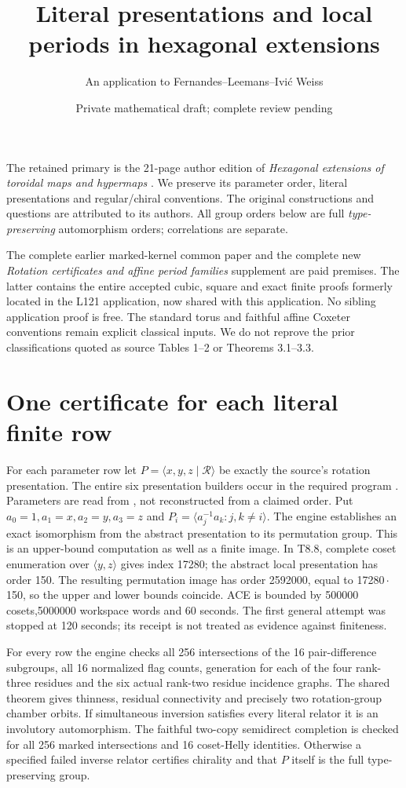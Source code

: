 \documentclass[10pt,a4paper]{article}
\title{Literal presentations and local periods in hexagonal extensions}
\author{An application to Fernandes--Leemans--Ivi\'c Weiss}
\date{Private mathematical draft; complete review pending}
\newcommand{\gen}[1]{\langle#1\rangle}
\begin{document}
\maketitle
The retained primary is the 21-page author edition of
\emph{Hexagonal extensions of toroidal maps and hypermaps} \cite{source}.
We preserve its parameter order, literal presentations and regular/chiral
conventions. The original constructions and questions are attributed to
its authors. All group orders below are full \emph{type-preserving}
automorphism orders; correlations are separate.

The complete earlier marked-kernel common paper and the complete new
\emph{Rotation certificates and affine period families} supplement are
paid premises. The latter contains the entire accepted cubic, square
and exact finite proofs formerly located in the L121 application, now
shared with this application. No sibling application proof is free.
The standard torus and faithful affine Coxeter conventions remain
explicit classical inputs. We do not reprove the prior classifications
quoted as source Tables 1--2 or Theorems 3.1--3.3.

\section{One certificate for each literal finite row}
For each parameter row let $P=\gen{x,y,z\mid\mathcal R}$ be exactly the
source's rotation presentation. The entire six presentation builders
occur in the required program .
Parameters are read from , not reconstructed
from a claimed order. Put $a_0=1,a_1=x,a_2=y,a_3=z$ and
$P_i=\gen{a_j^{-1}a_k:j,k\ne i}$.
The engine establishes an exact isomorphism from the abstract
presentation to its permutation group. This is an upper-bound
computation as well as a finite image. In T8.8, complete coset
enumeration over $\gen{y,z}$ gives index 17280; the abstract local
presentation has order 150. The resulting permutation image has
order 2592000, equal to 17280\,$\cdot$\,150, so the upper and lower
bounds coincide. ACE is bounded by 500000 cosets,5000000 workspace
words and 60 seconds. The first general attempt was stopped at 120
seconds; its receipt is not treated as evidence against finiteness.

For every row the engine checks all 256 intersections of the 16
pair-difference subgroups, all 16 normalized flag counts, generation
for each of the four rank-three residues and the six actual rank-two
residue incidence graphs. The shared theorem gives thinness, residual
connectivity and precisely two rotation-group chamber orbits.
If simultaneous inversion satisfies every literal relator it is an
involutory automorphism. The faithful two-copy semidirect completion
is checked for all 256 marked intersections and 16 coset-Helly identities.
Otherwise a specified failed inverse relator certifies chirality and
that $P$ itself is the full type-preserving group.
\end{document}
